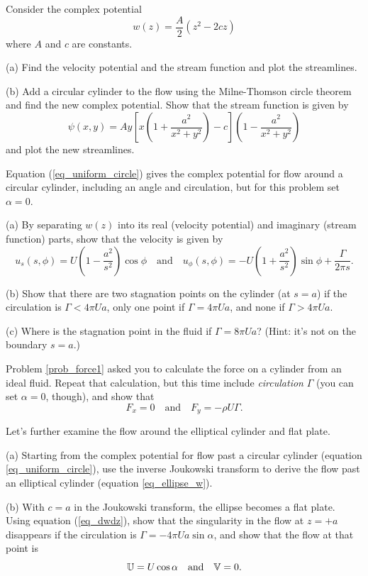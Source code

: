 \begin{problem}
Consider the complex potential
\[
w(z) = \frac{A}{2} (z^2 - 2cz)
\]
where $A$ and $c$ are constants.  

(a) Find the velocity potential and the stream function and plot the streamlines.

(b) Add a circular cylinder to the flow using the Milne-Thomson circle theorem and find the new complex potential.  Show that the stream function is given by
\[
\psi(x, y) = Ay \left[ x \left( 1 + \frac{a^2}{x^2 + y^2} \right) - c\right] \left(1 - \frac{a^2}{x^2 + y^2} \right)
\]
and plot the new streamlines.
\end{problem}

\begin{problem}
\label{prob_circlular_cylinder}
Equation (\ref{eq_uniform_circle}) gives the complex potential for flow around a circular cylinder, including an angle and circulation, but for this problem set $\alpha = 0$.  

(a) By separating $w(z)$ into its real (velocity potential) and imaginary (stream function) parts, show that the velocity is given by
\[
u_s(s, \phi) = U \left( 1 - \frac{a^2}{s^2} \right) \cos \phi \quad \text{and} \quad u_\phi(s, \phi) = -U \left( 1 + \frac{a^2}{s^2} \right) \sin \phi + \frac{\Gamma}{2\pi s}.
\]

(b) Show that there are two stagnation points on the cylinder (at $s = a$) if the circulation is $\Gamma < 4\pi U a$, only one point if $\Gamma = 4\pi U a$, and none if $\Gamma > 4\pi U a$. 

(c) Where is the stagnation point in the fluid if $\Gamma = 8 \pi U a$?  (Hint: it's not on the boundary $s=a$.)
\end{problem}

\begin{problem}
\label{prob_force2}
Problem \ref{prob_force1} asked you to calculate the force on a cylinder from an ideal fluid.  Repeat that calculation, but this time include \emph{circulation} $\Gamma$ (you can set $\alpha = 0$, though), and show that
\[
F_x = 0 \quad \text{and} \quad F_y = -\rho U \Gamma.
\]
\end{problem}

\begin{problem}
\label{prob_flat_plate}
Let's further examine the flow around the elliptical cylinder and flat plate.

(a) Starting from the complex potential for flow past a circular cylinder (equation \ref{eq_uniform_circle}), use the inverse Joukowski transform to derive the flow past an elliptical cylinder (equation \ref{eq_ellipse_w}).

(b) With $c = a$ in the Joukowski transform, the ellipse becomes a flat plate.  Using equation (\ref{eq_dwdz}), show that the singularity in the flow at $z = +a$ disappears if the circulation is $\Gamma = -4\pi U a \sin \alpha$, and show that the flow at that point is
\[
\mathbb{U} = U \cos \alpha \quad \text{and} \quad \mathbb{V} = 0.
\]
\end{problem}

